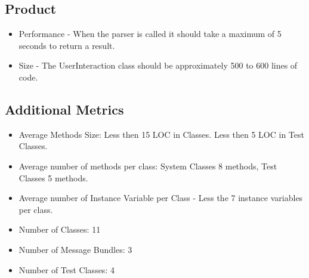\documentclass{article}
\begin{document}
		\subsection*{Product}
			\begin{itemize}
				\item Performance - When the parser is called it should take a maximum of 5 seconds to return a result.
				\item Size - The UserInteraction class should be approximately 500 to 600 lines of code.
			\end{itemize}
		\subsection*{Additional Metrics}
			\begin{itemize}
				\item Average Methods Size: Less then 15 LOC in Classes. Less then 5 LOC in Test Classes.
				\item Average number of methods per class: System Classes 8 methods, Test Classes 5 methods.
				\item Average number of Instance Variable per Class - Less the 7 instance variables per class.
				\item Number of Classes: 11
				\item Number of Message Bundles: 3
				\item Number of Test Classes: 4
			\end{itemize}
	
	
\end{document}

